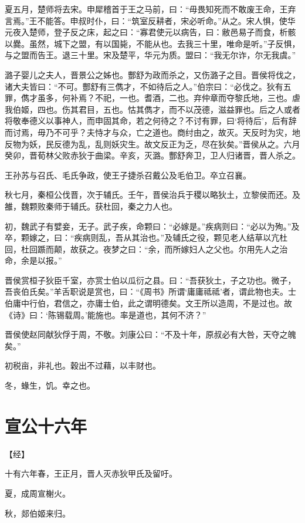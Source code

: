 \documentclass[a4paper,12pt,UTF8,twoside]{ctexbook}
\begin{document}
夏五月，楚师将去宋。申犀稽首于王之马前，曰：“毋畏知死而不敢废王命，王弃言焉。”王不能答。申叔时仆，曰：“筑室反耕者，宋必听命。”从之。宋人惧，使华元夜入楚师，登子反之床，起之曰：“寡君使元以病告，曰：敝邑易子而食，析骸以爨。虽然，城下之盟，有以国毙，不能从也。去我三十里，唯命是听。”子反惧，与之盟而告王。退三十里。宋及楚平，华元为质。盟曰：“我无尔诈，尔无我虞。”

潞子婴儿之夫人，晋景公之姊也。酆舒为政而杀之，又伤潞子之目。晋侯将伐之，诸大夫皆曰：“不可。酆舒有三儁才，不如待后之人。”伯宗曰：“必伐之。狄有五罪，儁才虽多，何补焉？不祀，一也。耆酒，二也。弃仲章而夺黎氏地，三也。虐我伯姬，四也。伤其君目，五也。怙其儁才，而不以茂德，滋益罪也。后之人或者将敬奉德义以事神人，而申固其命，若之何待之？不讨有罪，曰‘将待后’，后有辞而讨焉，毋乃不可乎？夫恃才与众，亡之道也。商纣由之，故灭。天反时为灾，地反物为妖，民反德为乱，乱则妖灾生。故文反正为乏，尽在狄矣。”晋侯从之。六月癸卯，晋荀林父败赤狄于曲梁。辛亥，灭潞。酆舒奔卫，卫人归诸晋，晋人杀之。

王孙苏与召氏、毛氏争政，使王子捷杀召戴公及毛伯卫。卒立召襄。

秋七月，秦桓公伐晋，次于辅氏。壬午，晋侯治兵于稷以略狄土，立黎侯而还。及雒，魏颗败秦师于辅氏。获杜回，秦之力人也。

初，魏武子有嬖妾，无子。武子疾，命颗曰：“必嫁是。”疾病则曰：“必以为殉。”及卒，颗嫁之，曰：“疾病则乱，吾从其治也。”及辅氏之役，颗见老人结草以亢杜回，杜回踬而颠，故获之。夜梦之曰：“余，而所嫁妇人之父也。尔用先人之治命，余是以报。”

晋侯赏桓子狄臣千室，亦赏士伯以瓜衍之县。曰：“吾获狄土，子之功也。微子，吾丧伯氏矣。”羊舌职说是赏也，曰：“《周书》所谓‘庸庸祗祗’者，谓此物也夫。士伯庸中行伯，君信之，亦庸士伯，此之谓明德矣。文王所以造周，不是过也。故《诗》曰：‘陈锡载周。’能施也。率是道也，其何不济？”

晋侯使赵同献狄俘于周，不敬。刘康公曰：“不及十年，原叔必有大咎，天夺之魄矣。”

初税亩，非礼也。穀出不过藉，以丰财也。

冬，蝝生，饥。幸之也。


\section{宣公十六年}



【经】

十有六年春，王正月，晋人灭赤狄甲氏及留吁。

夏，成周宣榭火。

秋，郯伯姬来归。
\end{document}
